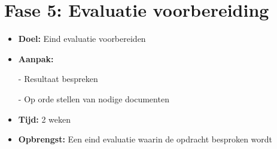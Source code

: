 \section{Fase 5: Evaluatie voorbereiding}
\label{sec:m-evaluatie-voorbereiding}
\begin{itemize}
    \item \textbf{Doel:}
    Eind evaluatie voorbereiden
    \item \textbf{Aanpak:}
    \item[-] Resultaat bespreken
    \item[-] Op orde stellen van nodige documenten
    \item \textbf{Tijd:} 2 weken
    \item \textbf{Opbrengst:}
    Een eind evaluatie waarin de opdracht besproken wordt
\end{itemize}


